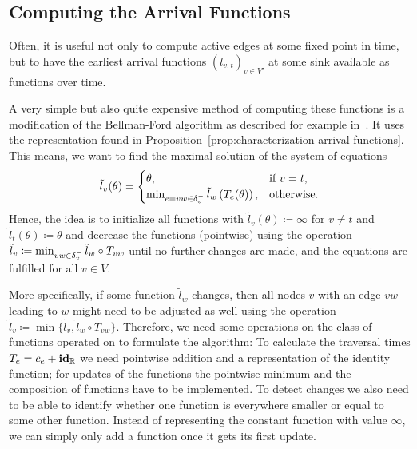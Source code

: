 \subsection{Computing the Arrival Functions}

Often, it is useful not only to compute active edges at some fixed point in time, but to have the earliest arrival functions $(l_{v,t})_{v\in V'}$ at some sink available as functions over time.

A very simple but also quite expensive method of computing these functions is a modification of the Bellman-Ford algorithm as described for example in~\cite{TimeDepShortestPaths}.
It uses the representation found in Proposition~\ref{prop:characterization-arrival-functions}.
This means, we want to find the maximal solution of the system of equations \[
    \tilde l_v(\theta) = \begin{cases}
        \theta, &\text{if $v = t$}, \\
        \min_{\substack{
            e=vw\in\delta^-_{v}               
        }} \tilde{l}_w\left(
            T_e(\theta)
        \right), &\text{otherwise}.
    \end{cases}
\]
Hence, the idea is to initialize all functions with $\tilde l_v(\theta) \coloneqq \infty$ for $v\neq t$ and $\tilde l_t(\theta) \coloneqq \theta$ and decrease the functions (pointwise) using the operation $\tilde l_v \coloneqq \min_{vw\in\delta^-_{v}} \tilde l_w \circ T_{vw}$ until no further changes are made, and the equations are fulfilled for all $v\in V$.

More specifically, if some function $\tilde l_w$ changes, then all nodes $v$ with an edge $vw$ leading to $w$ might need to be adjusted as well using the operation $\tilde l_v \coloneqq \min\{ \tilde l_v, \tilde l_w \circ T_{vw} \}$.
Therefore, we need some operations on the class of functions operated on to formulate the algorithm:
To calculate the traversal times $T_e = c_e + \mathbf{id}_{\mathbb{R}}$ we need pointwise addition and a representation of the identity function; for updates of the functions the pointwise minimum and the composition of functions have to be implemented.
To detect changes we also need to be able to identify whether one function is everywhere smaller or equal to some other function. 
Instead of representing the constant function with value $\infty$, we can simply only add a function once it gets its first update.

